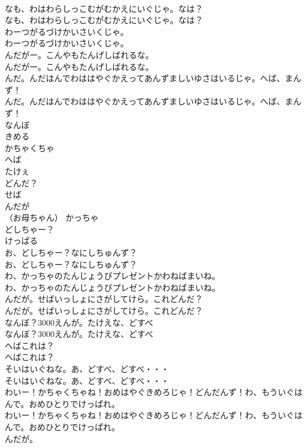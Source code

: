 \documentclass[8pt]{extreport}
\begin{document}
\begin{CJK}{UTF8}{min}
\\	なも、わはわらしっこむがむかえにいぐじゃ。なは？	
\\	なも、わはわらしっこむがむかえにいぐじゃ。なは？ 
\\	わーつがるづけかいさいくじゃ。	
\\	わーつがるづけかいさいくじゃ。 
\\	んだがー。こんやもたんげしばれるな。	
\\	んだがー。こんやもたんげしばれるな。 
\\	んだ。んだはんでわははやぐかえってあんずましいゆさはいるじゃ。へば、まんず！	
\\	んだ。んだはんでわははやぐかえってあんずましいゆさはいるじゃ。へば、まんず！ 
\\	なんぼ
\\	きめる
\\	かちゃくちゃ
\\	へば
\\	たけぇ
\\	どんだ？
\\	せば
\\	んだが
\\	（お母ちゃん）	かっちゃ
\\	どしちゃー？
\\	けっぱる
\\	お、どしちゃー？なにしちゅんず？	
\\	お、どしちゃー？なにしちゅんず？ 
\\	わ、かっちゃのたんじょうびプレゼントかわねばまいね。	
\\	わ、かっちゃのたんじょうびプレゼントかわねばまいね。 
\\	んだが。せばいっしょにさがしてけら。これどんだ？	
\\	んだが。せばいっしょにさがしてけら。これどんだ？ 
\\	なんぼ？3000えんが。たけえな、どすべ	
\\	なんぼ？3000えんが。たけえな、どすべ 
\\	へばこれは？	
\\	へばこれは？ 
\\	そいはいぐねな。あ、どすべ、どすべ・・・	
\\	そいはいぐねな。あ、どすべ、どすべ・・・ 
\\	わいー！かちゃくちゃね！おめはやぐきめろじゃ！どんだんず！わ、もういぐはんで。おめひとりでけっぱれ。	
\\	わいー！かちゃくちゃね！おめはやぐきめろじゃ！どんだんず！わ、もういぐはんで。おめひとりでけっぱれ。 
\\	んだが。	

\end{CJK}
\end{document}
